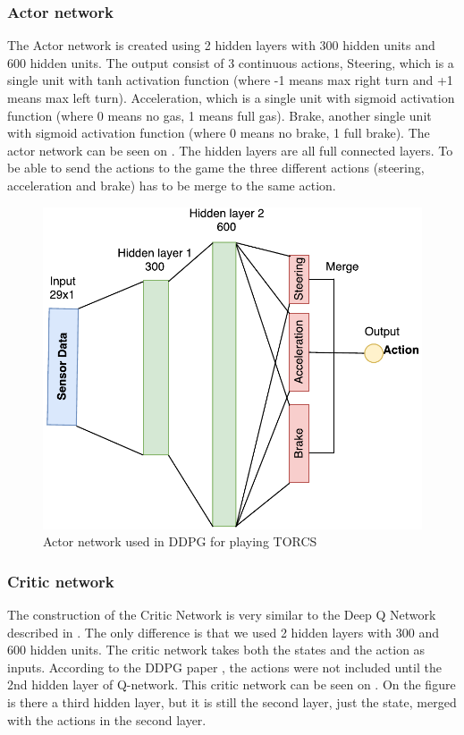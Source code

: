 \subsubsection{Actor network}
The Actor network is created using  2 hidden layers with 300 hidden units and 600 hidden units. The output consist of 3 continuous actions, Steering, which is a single unit with tanh activation function (where -1 means max right turn and +1 means max left turn). Acceleration, which is a single unit with sigmoid activation function (where 0 means no gas, 1 means full gas). Brake, another single unit with sigmoid activation function (where 0 means no brake, 1 full brake). The actor network can be seen on . The hidden layers are all full connected layers. To be able to send the actions to the game the three different actions (steering, acceleration and brake) has to be merge to the same action. 

\begin{figure}[H]
	\centering
	\includegraphics[width=1\textwidth]{Figures/Architecture/DDPG/DDPG_Actor_network.pdf}
	\caption{Actor network used in DDPG for playing TORCS }
	\label{fig:DDPG_Actor_network}
\end{figure}  


\subsubsection{Critic network}
The construction of the Critic Network is very similar to the Deep Q Network described in . The only difference is that we used 2 hidden layers with 300 and 600 hidden units. The critic network takes both the states and the action as inputs. According to the DDPG paper \cite{DBLP:journals/corr/LillicrapHPHETS15}, the actions were not included until the 2nd hidden layer of Q-network. This critic network can be seen on . On the figure is there a third hidden layer, but it is still the second layer, just the state, merged with the actions in the second layer.

